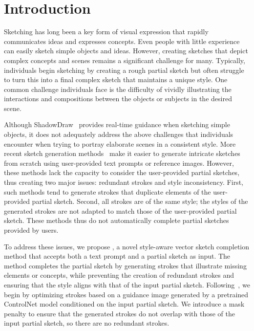 \section{Introduction}
\label{sec:intro}
Sketching has long been a key form of visual expression that rapidly communicates ideas and expresses concepts.
Even people with little experience can easily sketch simple objects and ideas.
However, creating sketches that depict complex concepts and scenes remains a significant challenge for many.
Typically, individuals begin sketching by creating a rough partial sketch but often struggle to turn this into a final complex sketch that maintains a unique style.
One common challenge individuals face is the difficulty of vividly illustrating the interactions and compositions between the objects or subjects in the desired scene.

Although ShadowDraw~\cite{lee2011shadowdraw} provides real-time guidance when sketching simple objects, it does not adequately address the above challenges that individuals encounter when trying to portray elaborate scenes in a consistent style.
More recent sketch generation methods~\cite{vinker2023clipascene,xing2023diffsketcher} make it easier to generate intricate sketches from scratch using user-provided text prompts or reference images.
However, these methods lack the capacity to consider the user-provided partial sketches, thus creating two major issues: redundant strokes and style inconsistency.
First, such methods tend to generate strokes that duplicate elements of the user-provided partial sketch.
Second, all strokes are of the same style; the styles of the generated strokes are not adapted to match those of the user-provided partial sketch.
These methods thus do not automatically complete partial sketches provided by users.

To address these issues, we propose \methodName, a novel style-aware vector sketch completion method that accepts both a text prompt and a partial sketch as input.
The method completes the partial sketch by generating strokes that illustrate missing elements or concepts, while preventing the creation of redundant strokes and ensuring that the style aligns with that of the input partial sketch.
Following~\cite{xing2023diffsketcher}, we begin by optimizing strokes based on a guidance image generated by a pretrained ControlNet model conditioned on the input partial sketch.
We introduce a mask penalty to ensure that the generated strokes do not overlap with those of the input partial sketch, so there are no redundant strokes.

